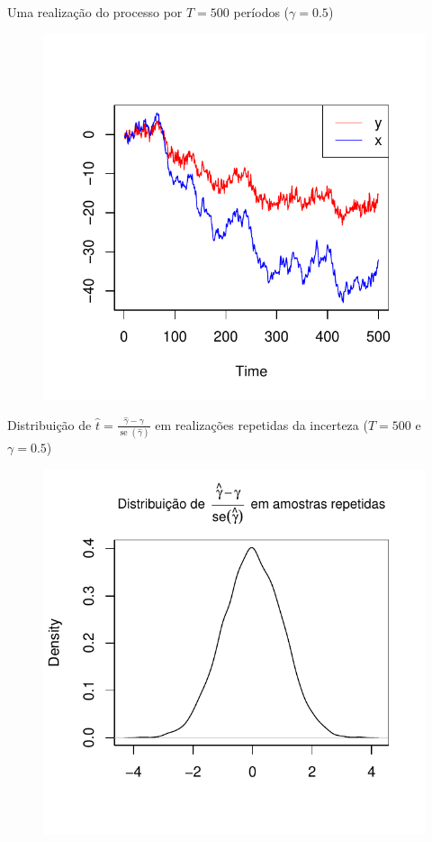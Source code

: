 \documentclass[11pt]{beamer}
\begin{document}
\begin{frame}{Uma realização do processo por $T=500$ períodos ($\gamma =0.5$)}
\begin{figure}
	\centering
	\includegraphics[scale=0.7]{graficos/tendencia_comum.pdf}
\end{figure}
\end{frame}

\begin{frame}{Distribuição de $\hat t = \frac{\hat \gamma - \gamma}{\operatorname{se}(\hat \gamma)}$ em realizações repetidas da incerteza ($T=500$  e $\gamma =0.5$)}
\begin{figure}
	\centering
	\includegraphics[scale=0.7]{graficos/distribuicao_that.pdf}
\end{figure}
\end{frame}
\end{document}
